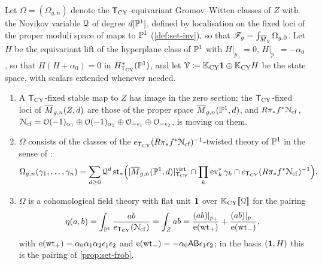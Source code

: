 Let $\Omega=(\Omega_{g,n})$ denote the $\mathsf{T}_{\mathrm{CY}}$-equivariant Gromov--Witten classes of $Z$ with the Novikov variable $\mathcal{Q}$ of degree $d[\mathbb{P}^1]$, defined by localisation on the fixed loci of the proper moduli space of maps to $\mathbb{P}^1$ (\cref{def:set-inv}), so that $\mathscr{F}_g=\int_{\overline{M}_g}\Omega_{g,0}$. Let $H$ be the equivariant lift of the hyperplane class of $\mathbb{P}^1$ with $H|_{p_+}=0$, $H|_{p_-}=-\alpha_0$, so that $H(H+\alpha_0)=0$ in $H^*_{\mathsf{T}_{\mathrm{CY}}}(\mathbb{P}^1)$, and let $\mathcal{V}\coloneqq\mathbb{K}_{\mathrm{CY}}\mathbf{1}\oplus\mathbb{K}_{\mathrm{CY}} H$ be the state space, with scalars extended whenever needed.

\begin{lem}
\label{lem:ide-fixed}
\begin{enumerate}
\item A $\mathsf{T}_{\mathrm{CY}}$-fixed stable map to $Z$ has image in the zero section; the $\mathsf{T}_{\mathrm{CY}}$-fixed loci of $\overline{M}_{g,n}(Z,d)$ are those of the proper space $\overline{M}_{g,n}(\mathbb{P}^1,d)$, and $R\pi_*f^*\mathcal{N}_{\mathrm{cf}}$, $\mathcal{N}_{\mathrm{cf}}=\mathcal{O}(-1)_{\alpha_1}\oplus\mathcal{O}(-1)_{\alpha_2}\oplus\mathcal{O}_{-\epsilon_1}\oplus\mathcal{O}_{-\epsilon_2}$, is moving on them.
\item $\Omega$ consists of the classes of the $e_{\mathsf{T}_{\mathrm{CY}}}(R\pi_*f^*\mathcal{N}_{\mathrm{cf}})^{-1}$-twisted theory of $\mathbb{P}^1$ in the sense of \cite[Section~1]{CG07}:
\[
\Omega_{g,n}(\gamma_1,\dots,\gamma_n)=\sum_{d\geq 0}\mathcal{Q}^d\,\mathrm{st}_*\Big([\overline{M}_{g,n}(\mathbb{P}^1,d)]^{\mathrm{virt}}_{\mathsf{T}_{\mathrm{CY}}}\cap\prod_k\operatorname{ev}_k^*\gamma_k\cap e_{\mathsf{T}_{\mathrm{CY}}}(R\pi_*f^*\mathcal{N}_{\mathrm{cf}})^{-1}\Big).
\]
\item $\Omega$ is a cohomological field theory with flat unit $\mathbf{1}$ over $\mathbb{K}_{\mathrm{CY}}[\![ \mathcal{Q} ]\!]$ for the pairing
\[
\eta(a,b)=\int_{\mathbb{P}^1}\frac{ab}{e_{\mathsf{T}_{\mathrm{CY}}}(\mathcal{N}_{\mathrm{cf}})}=\int_Z ab=\frac{(ab)|_{p_+}}{\mathrm{e}(\mathrm{wt}_+)}+\frac{(ab)|_{p_-}}{\mathrm{e}(\mathrm{wt}_-)},
\]
with $\mathrm{e}(\mathrm{wt}_+)=\alpha_0\alpha_1\alpha_2\epsilon_1\epsilon_2$ and $\mathrm{e}(\mathrm{wt}_-)=-\alpha_0\mathsf{A}\mathsf{B}\epsilon_1\epsilon_2$; in the basis $(\mathbf{1},H)$ this is the pairing of \cref{prop:set-frob}.
\end{enumerate}
\end{lem}
